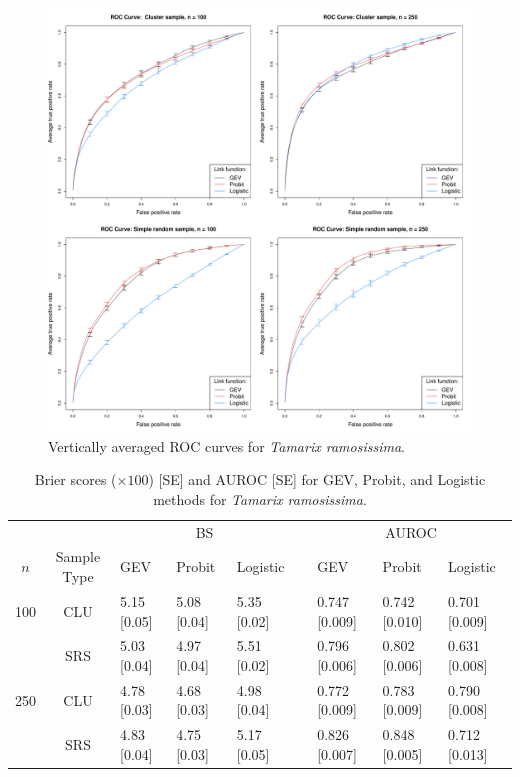 \begin{figure}
  \includegraphics[width=\linewidth]{plots/data-perf-species1}
  \caption{Vertically averaged ROC curves for \emph{Tamarix ramosissima}.}
  \label{rbfig:dataroc}
\end{figure}

\begin{table}
  \caption{Brier scores ($\times 100$) [SE] and AUROC [SE] for GEV, Probit, and Logistic methods for \emph{Tamarix ramosissima}.}
  \label{rbtbl:dataresults}
  \centering
  \footnotesize
  \begin{tabular}{cclllclll}
  \toprule
    \multicolumn{2}{c}{ }& \multicolumn{3}{c}{BS} & \phantom{abc} & \multicolumn{3}{c}{AUROC}\\
    \cmidrule{3-5} \cmidrule{7-9}
    \multicolumn{1}{c}{$n$} & \multicolumn{1}{c}{Sample Type} & GEV    & Probit & Logistic & \phantom{abc} & GEV    & Probit & Logistic \\
  \midrule
  100 & CLU & 5.15 [0.05] & 5.08 [0.04] & 5.35 [0.02] && 0.747 [0.009] 
      & 0.742 [0.010] & 0.701 [0.009]\\
      & SRS & 5.03 [0.04] & 4.97 [0.04] & 5.51 [0.02] && 0.796 [0.006] 
      & 0.802 [0.006] & 0.631 [0.008]\\
  250 & CLU & 4.78 [0.03] & 4.68 [0.03] & 4.98 [0.04] && 0.772 [0.009] 
      & 0.783 [0.009] & 0.790 [0.008]\\
      & SRS & 4.83 [0.04] & 4.75 [0.03] & 5.17 [0.05] && 0.826 [0.007] 
      & 0.848 [0.005] & 0.712 [0.013]\\
  \bottomrule
  \end{tabular}
\end{table}

